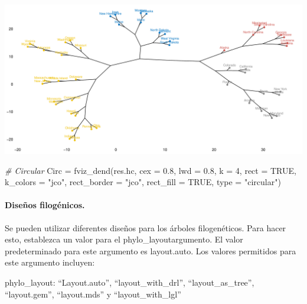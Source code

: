 \documentclass[
]{article}
\newenvironment{Shaded}{\begin{snugshade}}{\end{snugshade}}
\newcommand{\AttributeTok}[1]{\textcolor[rgb]{0.77,0.63,0.00}{#1}}
\newcommand{\CommentTok}[1]{\textcolor[rgb]{0.56,0.35,0.01}{\textit{#1}}}
\newcommand{\ConstantTok}[1]{\textcolor[rgb]{0.00,0.00,0.00}{#1}}
\newcommand{\DecValTok}[1]{\textcolor[rgb]{0.00,0.00,0.81}{#1}}
\newcommand{\FloatTok}[1]{\textcolor[rgb]{0.00,0.00,0.81}{#1}}
\newcommand{\FunctionTok}[1]{\textcolor[rgb]{0.00,0.00,0.00}{#1}}
\newcommand{\NormalTok}[1]{#1}
\newcommand{\OtherTok}[1]{\textcolor[rgb]{0.56,0.35,0.01}{#1}}
\newcommand{\StringTok}[1]{\textcolor[rgb]{0.31,0.60,0.02}{#1}}
\begin{document}
\includegraphics{clusterjerarquico1_files/figure-latex/unnamed-chunk-14-1.pdf}

\begin{Shaded}
\begin{Highlighting}[]
\CommentTok{\# Circular}
\NormalTok{Circ }\OtherTok{=} \FunctionTok{fviz\_dend}\NormalTok{(res.hc, }\AttributeTok{cex =} \FloatTok{0.8}\NormalTok{, }\AttributeTok{lwd =} \FloatTok{0.8}\NormalTok{, }\AttributeTok{k =} \DecValTok{4}\NormalTok{,}
                 \AttributeTok{rect =} \ConstantTok{TRUE}\NormalTok{,}
                 \AttributeTok{k\_colors =} \StringTok{"jco"}\NormalTok{,}
                 \AttributeTok{rect\_border =} \StringTok{"jco"}\NormalTok{,}
                 \AttributeTok{rect\_fill =} \ConstantTok{TRUE}\NormalTok{,}
                 \AttributeTok{type =} \StringTok{"circular"}\NormalTok{)}
\end{Highlighting}
\end{Shaded}

\hypertarget{diseuxf1os-filoguxe9nicos.}{%
\paragraph{Diseños filogénicos.}\label{diseuxf1os-filoguxe9nicos.}}

Se pueden utilizar diferentes diseños para los árboles filogenéticos.
Para hacer esto, establezca un valor para el phylo\_layoutargumento. El
valor predeterminado para este argumento es layout.auto. Los valores
permitidos para este argumento incluyen:

phylo\_layout: ``Layout.auto'', ``layout\_with\_drl'',
``layout\_as\_tree'', ``layout.gem'', ``layout.mds'' y
``layout\_with\_lgl''
\end{document}
